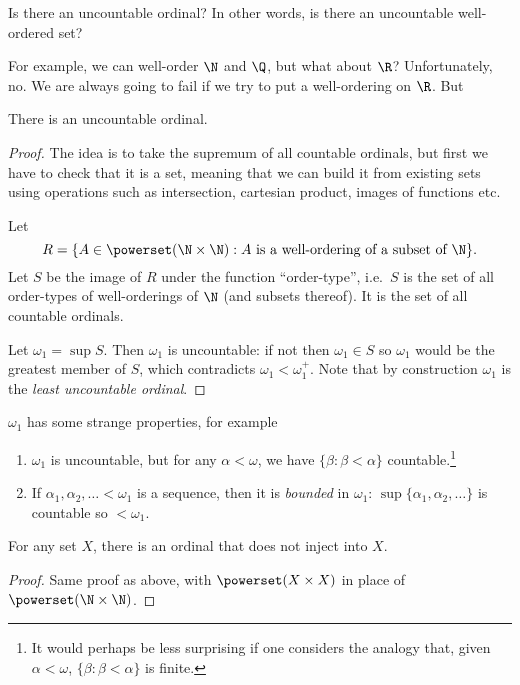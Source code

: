 \documentclass[a4paper]{article}
\begin{document}
Is there an uncountable ordinal? In other words, is there an uncountable well-ordered set?

For example, we can well-order \(\N\) and \(\Q\), but what about \(\R\)? Unfortunately, no. We are always going to fail if we try to put a well-ordering on \(\R\). But

\begin{theorem}
  There is an uncountable ordinal.
\end{theorem}

\begin{proof}
  The idea is to take the supremum of all countable ordinals, but first we have to check that it is a set, meaning that we can build it from existing sets using operations such as intersection, cartesian product, images of functions etc.

  Let
  \[
    R = \{A \in \powerset(\N \times \N): A \text{ is a well-ordering of a subset of } \N\}.
  \]
  Let \(S\) be the image of \(R\) under the function ``order-type'', i.e.\ \(S\) is the set of all order-types of well-orderings of \(\N\) (and subsets thereof). It is the set of all countable ordinals.

  Let \(\omega_1 = \sup S\). Then \(\omega_1\) is uncountable: if not then \(\omega_1 \in S\) so \(\omega_1\) would be the greatest member of \(S\), which contradicts \(\omega_1 < \omega_1^+\). Note that by construction \(\omega_1\) is the \emph{least uncountable ordinal}.
\end{proof}

\(\omega_1\) has some strange properties, for example
\begin{enumerate}
\item \(\omega_1\) is uncountable, but for any \(\alpha < \omega\), we have \(\{\beta: \beta < \alpha\}\) countable.\footnote{It would perhaps be less surprising if one considers the analogy that, given \(\alpha < \omega\), \(\{\beta: \beta < \alpha\}\) is finite.}
\item If \(\alpha_1, \alpha_2, \dots < \omega_1\) is a sequence, then it is \emph{bounded} in \(\omega_1\): \(\sup\{\alpha_1, \alpha_2, \dots\}\) is countable so \(< \omega_1\).
\end{enumerate}

\begin{theorem}
  For any set \(X\), there is an ordinal that does not inject into \(X\).
\end{theorem}

\begin{proof}
  Same proof as above, with \(\powerset(X \times X)\) in place of \(\powerset(\N \times \N)\).
\end{proof}
\end{document}
